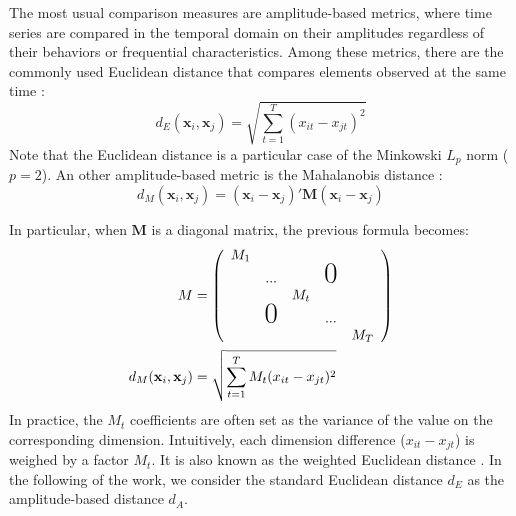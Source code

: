 The most usual comparison measures are amplitude-based metrics, where time series are compared in the temporal domain on their amplitudes regardless of their behaviors or frequential characteristics. Among these metrics, there are the commonly used Euclidean distance that compares elements observed at the same time \cite{Ding2008}: 
\begin{equation}	
	d_E(\textbf{x}_i,\textbf{x}_j) = \sqrt{\sum\limits_{t=1}^{T} (x_{it}-x_{jt})^2}
\label{eq:A}
\end{equation}
Note that the Euclidean distance is a particular case of the Minkowski $L_p$ norm ($p=2$). An other amplitude-based metric is the Mahalanobis distance \cite{Prekopcsak2012}:
\begin{equation}	
	d_M(\textbf{x}_i,\textbf{x}_j) = (\textbf{x}_i-\textbf{x}_j)'\textbf{M}(\textbf{x}_i-\textbf{x}_j)
	\label{eq:dM}
\end{equation}

\noindent In particular, when $\textbf{M}$ is a diagonal matrix, the previous formula becomes: 
\begin{align}
M &= 
	\left(
	\begin{array}{ccccc}
	M_1\\
	& ... & & \text{\huge0}\\
	& & M_t & &\\
	& \text{\huge0} & & ... \\
	& & & & M_T
	\end{array}
	\right)	\\
d_M(\textbf{x}_i,\textbf{x}_j) & = \sqrt{\sum\limits_{t=1}^{T} M_t(x_{it}-x_{jt})^2}
\label{eq:dM2}
\end{align}
In practice, the $M_t$ coefficients are often set as the variance of the value on the corresponding dimension. Intuitively, each dimension difference ($x_{it}-x_{jt}$) is weighed by a factor $M_t$. It is also known as the weighted Euclidean distance \cite{McNames2002}. In the following of the work, we consider the standard Euclidean distance $d_E$ as the amplitude-based distance $d_A$.

